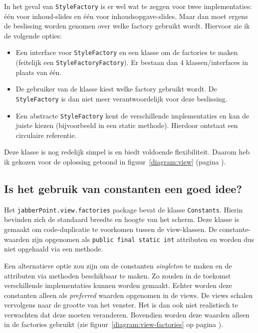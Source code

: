 \documentclass[a4paper]{article}
\newcommand{\question}[1]{
  \subsection{#1}
}
\newcommand{\code}[1]{\lstinline[columns=fixed]{#1}}
\begin{document}
		In het geval van \code{StyleFactory} is er wel wat te zeggen voor twee implementaties: één voor inhoud-slides en één voor inhoudsopgave-slides.
		Maar dan moet ergens de beslissing worden genomen over welke factory gebruikt wordt.
		Hiervoor zie ik de volgende opties:
		\begin{itemize}
			\item Een interface voor \code{StyleFactory} en een klasse om de factories te maken (feitelijk een \code{StyleFactoryFactory}).
				Er bestaan dan 4 klassen/interfaces in plaats van één.
			\item De gebruiker van de klasse kiest welke factory gebruikt wordt.
				De \code{Style}\-\code{Factory} is dan niet meer verantwoordelijk voor deze beslissing.
			\item Een abstracte \code{StyleFactory} kent de verschillende implementaties en kan de juiste kiezen (bijvoorbeeld in een static methode).
				Hierdoor ontstaat een circulaire referentie.
		\end{itemize}
		Deze klasse is nog redelijk simpel is en biedt voldoende flexibiliteit.
		Daarom heb ik gekozen voor de oplossing getoond in figuur~\ref{diagram:view} (pagina \pageref{diagram:view}).

	\question{Is het gebruik van constanten een goed idee?}
		Het \code{jabberPoint.view.factories} package bevat de klasse \code{Constants}.
		Hierin bevinden zich de standaard breedte en hoogte van het scherm.
		Deze klasse is gemaakt om code-duplicatie te voorkomen tussen de view-klassen.
		De constante-waarden zijn opgenomen als \code{public final static int} attributen en worden dus niet opgehaald via een methode.

		Een alternatieve optie zou zijn om de constanten \textit{singleton} te maken en de attributen via methoden beschikbaar te maken.
		Zo zouden in de toekomst verschillende implementaties kunnen worden gemaakt.
		Echter worden deze constanten alleen als \textit{preferred} waarden opgenomen in de views.
		De views schalen vervolgens naar de grootte van het venster.
		Het is dan ook niet realistisch te verwachten dat deze moeten veranderen.
		Bovendien worden deze waarden alleen in de factories gebruikt (zie figuur~\ref{diagram:view-factories} op pagina \pageref{diagram:view-factories}).
\end{document}
